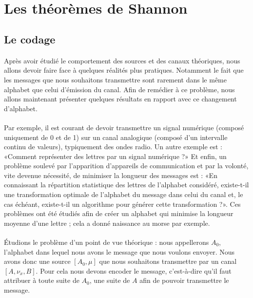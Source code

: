 \section{Les théorèmes de Shannon}

\subsection{Le codage}
	\paragraph{}
	Après avoir étudié le comportement des sources et des canaux théoriques, 
	nous allons devoir faire face à quelques réalités plus pratiques. 
	Notamment le fait que les messages que nous souhaitons transmettre sont 
	rarement dans le même alphabet que celui d'émission du canal. Afin de 
	remédier à ce problème, nous allons maintenant présenter quelques
	résultats en rapport avec ce changement d'alphabet. 
	
	\paragraph{}
	Par exemple, il est courant de devoir transmettre un signal numérique
	(composé uniquement de 0 et de 1) sur un canal analogique (composé 
	d'un intervalle continu de valeurs), typiquement des ondes radio.
	Un autre exemple est : «Comment représenter des 
	lettres par un signal numérique ?» Et enfin, un problème soulevé par 
	l'apparition d'appareils de communication et par la volonté, vite
	devenue nécessité, de minimiser la longueur des messages est :
	«En connaissant la répartition statistique des lettres de l'alphabet 
	considéré, existe-t-il une transformation optimale de l'alphabet du 
	message	dans celui du canal et, le cas échéant, existe-t-il un 
	algorithme pour générer cette transformation ?». Ces problèmes ont été 
	étudiés afin de créer un alphabet qui minimise la longueur moyenne 
	d'une lettre ; cela a donné naissance au morse par exemple. 
	
	\paragraph{}
	Étudions le problème d'un point de vue théorique :
	nous appellerons $A_0$, l'alphabet dans lequel nous avons le message que 
	nous voulons envoyer. Nous avons donc une source $[A_0,\mu]$ que nous 
	souhaitons transmettre par un canal $[A,\nu_x,B]$. Pour cela nous devons 
	encoder le message, c'est-à-dire qu'il faut attribuer à toute suite de 
	$A_0$, une suite de $A$ afin de pouvoir transmettre le message.

